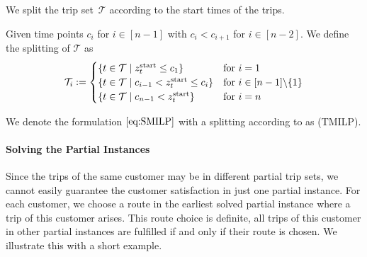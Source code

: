 We split the trip set~$\mathcal{T}$ according to the start times of the trips.

\begin{definition}
\label{def:time_dependent_splitting}

Given time points $c_i$ for $i\in[n-1]$ with $c_i<c_{i+1}$ for $i\in[n-2]$. We define the splitting of $\mathcal{T}$ as
\begin{align*}
	\mathcal{T}_i := \begin{cases}
		\left\{t\in\mathcal{T}\mid z^{\operatorname{start}}_t\leq c_1\right\} & \text{for } i=1 \\
		\left\{t\in\mathcal{T}\mid c_{i-1}<z^{\operatorname{start}}_t\leq c_i\right\} & \text{for } i\in[n-1]\backslash\{1\} \\
		\left\{t\in\mathcal{T}\mid c_{n-1}<z^{\operatorname{start}}_t\right\} & \text{for } i=n
	\end{cases}
\end{align*}

\end{definition}

We denote the formulation $\eqref{eq:SMILP}$ with a splitting according to  as (TMILP).

\paragraph{Solving the Partial Instances} \parfill

Since the trips of the same customer may be in different partial trip sets, we cannot easily guarantee the customer satisfaction in just one partial instance. For each customer, we choose a route in the earliest solved partial instance where a trip of this customer arises. This route choice is definite, \ie all trips of this customer in other partial instances are fulfilled if and only if their route is chosen. We illustrate this with a short example.

